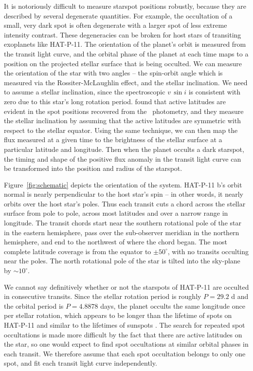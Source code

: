 It is notoriously difficult to measure starspot positions robustly, because they are described by several degenerate quantities. For example, the occultation of a small, very dark spot is often degenerate with a larger spot of less extreme intensity contrast. These degeneracies can be broken for host stars of transiting exoplanets like HAT-P-11. The orientation of the planet's orbit is measured from the transit light curve, and the orbital phase of the planet at each time maps to a position on the projected stellar surface that is being occulted. We can measure the orientation of the star with two angles -- the spin-orbit angle which is measured via the Rossiter-McLaughlin effect, and the stellar inclination. We need to assume a stellar inclination, since the spectroscopic $v\,\sin{i}$ is consistent with zero \citep{Bakos2010} due to this star's long rotation period. \citet{Sanchis-Ojeda2011} found that active latitudes are evident in the spot positions recovered from the \kepler\ photometry, and they measure the stellar inclination by assuming that the active latitudes are symmetric with respect to the stellar equator. Using the same technique, we can then map the flux measured at a given time to the brightness of the stellar surface at a particular latitude and longitude. Then when the planet occults a dark starspot, the timing and shape of the positive flux anomaly in the transit light curve can be transformed into the position and radius of the starspot. 

Figure~\ref{fig:schematic} depicts the orientation of the system. HAT-P-11 b's orbit normal is nearly perpendicular to the host star's spin -- in other words, it nearly orbits over the host star's poles. Thus each transit cuts a chord across the stellar surface from pole to pole, across most latitudes and over a narrow range in longitude. The transit chords start near the southern rotational pole of the star in the eastern hemisphere, pass over the sub-observer meridian in the northern hemisphere, and end to the northwest of where the chord began. The most complete latitude coverage is from the equator to $\pm 50^\circ$, with no transits occulting near the poles. The north rotational pole of the star is tilted into the sky-plane by $\sim10^\circ$.

We cannot say definitively whether or not the starspots of HAT-P-11 are occulted in consecutive transits. Since the stellar rotation period is roughly $P=29.2$ d and the orbital period is $P = 4.8878$ days, the planet occults the same longitude once per stellar rotation, which appears to be longer than the lifetime of spots on HAT-P-11 \citep{Sanchis-Ojeda2011} and similar to the lifetimes of sunspots \citep{Solanki2003}. The search for repeated spot occultations is made more difficult by the fact that there are active latitudes on the star, so one would expect to find spot occultations at similar orbital phases in each transit. We therefore assume that each spot occultation belongs to only one spot, and fit each transit light curve independently.

